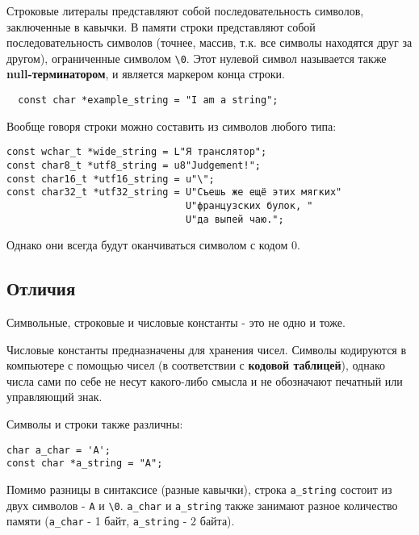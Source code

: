 Строковые литералы представляют собой последовательность символов,
заключенные в кавычки. В памяти строки представляют собой
последовательность символов (точнее, массив, т.к. все символы находятся
друг за другом), ограниченные символом \texttt{\textbackslash{}0}. Этот
нулевой символ называется также \textbf{null-терминатором}, и является
маркером конца строки.
\begin{verbatim}
  const char *example_string = "I am a string";
\end{verbatim}
Вообще говоря строки можно составить из символов любого типа:
\begin{verbatim}
const wchar_t *wide_string = L"Я транслятор";
const char8_t *utf8_string = u8"Judgement!";
const char16_t *utf16_string = u"\";
const char32_t *utf32_string = U"Съешь же ещё этих мягких"
                               U"французских булок, "
                               U"да выпей чаю.";
\end{verbatim}

Однако они всегда будут оканчиваться символом с кодом 0.

\subsection{Отличия}\label{ux43eux442ux43bux438ux447ux438ux44f}

Символьные, строковые и числовые константы - это не одно и тоже.

Числовые константы предназначены для хранения чисел. Символы кодируются
в компьютере с помощью чисел (в соответствии с \textbf{кодовой
таблицей}), однако числа сами по себе не несут какого-либо смысла и не
обозначают печатный или управляющий знак.

Символы и строки также различны:
\begin{verbatim}
char a_char = 'A';
const char *a_string = "A";
\end{verbatim}

Помимо разницы в синтаксисе (разные кавычки), строка \texttt{a\_string}
состоит из двух символов -
\texttt{\textquotesingle{}A\textquotesingle{}} и
\texttt{\textquotesingle{}\textbackslash{}0\textquotesingle{}}.
\texttt{a\_char} и \texttt{a\_string} также занимают разное количество
памяти (\texttt{a\_char} - 1 байт, \texttt{a\_string} - 2 байта).
